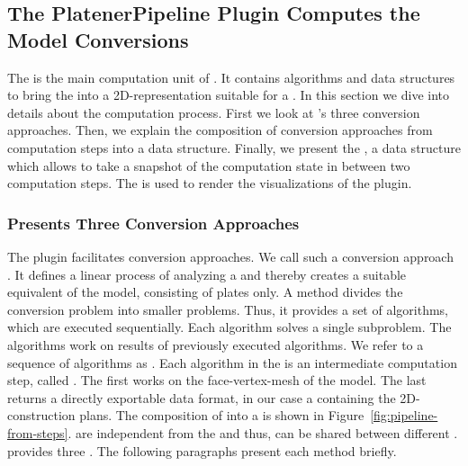 \documentclass[../ClassicThesis.tex]{subfiles}
\begin{document}
\subsection{The PlatenerPipeline Plugin Computes the Model
  Conversions}
\label{sec:platener-pipeline-plugin}


The  is the main computation unit of
{\platener}. It contains algorithms and data structures to
bring the {\threedmodel} into a 2D-representation suitable
for a {\lasercutter}. In this section we dive into details
about the computation process. First we look at
{\platener}'s three conversion approaches. Then, we explain
the composition of conversion approaches from computation
steps into a  data structure. Finally, we
present the , a data structure which
allows to take a snapshot of the computation state in
between two computation steps. The  is
used to render the visualizations of the
 plugin.


\subsubsection{{\platener} Presents Three Conversion
  Approaches}

The  plugin facilitates conversion
approaches. We call such a conversion approach
\class{\fabmethod}.
It defines a linear process of analyzing a {\threedmodel}
and thereby creates a suitable equivalent of the model,
consisting of plates only. A \class{\fabrication} method
divides the conversion problem into smaller problems. Thus,
it provides a set of algorithms, which are executed
sequentially. Each algorithm solves a single subproblem. The
algorithms work on results of previously executed
algorithms. We refer to a sequence of algorithms as
. Each algorithm in the  is
an intermediate computation step, called
. The first  works
on the face-vertex-mesh of the model. The last
 returns a directly exportable data
format, in our case a {\zipfile} containing the
2D-construction plans. The composition of
 into a  is shown in
Figure~\ref{fig:pipeline-from-steps}. 
are independent from the \class{\fabmethod} and thus, can be
shared between different . {\platener}
provides three . The following paragraphs
present each method briefly.
\end{document}
